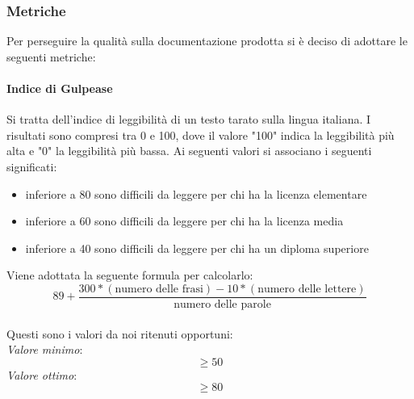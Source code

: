 \subsubsection{Metriche}
Per perseguire la qualità sulla documentazione prodotta si è deciso di adottare le seguenti metriche:
\paragraph{Indice di Gulpease}
Si tratta dell'indice di leggibilità di un testo tarato sulla lingua italiana.
I risultati sono compresi tra 0 e 100, dove il valore "100" indica la leggibilità più alta e "0" la leggibilità più bassa. Ai seguenti valori si associano i seguenti significati:
\begin{itemize}
\item inferiore a 80 sono difficili da leggere per chi ha la licenza elementare
\item inferiore a 60 sono difficili da leggere per chi ha la licenza media
\item inferiore a 40 sono difficili da leggere per chi ha un diploma superiore
\end{itemize}
Viene adottata la seguente formula per calcolarlo:
\begin{equation}
89+\frac{300*(\text{numero delle frasi})-10*(\text{numero delle lettere})}{\text{numero delle parole}}
\end{equation}\\
Questi sono i valori da noi ritenuti opportuni:\\
\textit{Valore minimo}:$$ \geq 50 $$ 
\textit{Valore ottimo}:$$ \geq 80 $$\\